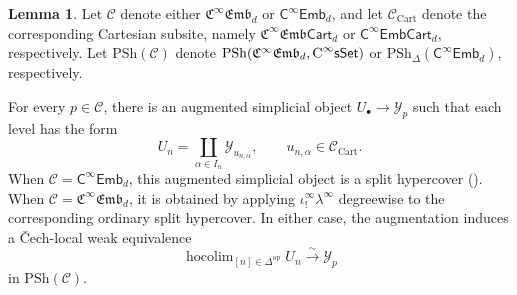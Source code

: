\documentclass{amsart}
\newcommand{\cat}[1]{\mathsf{#1}}
\newcommand{\sset}{\cat{sSet}}
\DeclareMathOperator*{\hocolim}{hocolim}
\newcommand{\CsSet}{\textnormal{C}^{\infty}\sset}
\newcommand{\fembnoniso}[1]{\cat{C}^{\infty}\cat{Emb}_{#1}}
\newcommand{\fembcartnoniso}[1]{\cat{C}^{\infty}\cat{EmbCart}_{#1}}
\newcommand{\femb}[1]{\mathfrak{C}^{\infty}\mathfrak{Emb}_{#1}}
\newcommand{\fembcart}[1]{\mathfrak{C}^{\infty}\mathfrak{Emb}\cat{Cart}_{#1}}
\newcommand{\psh}{\mathrm{PSh}}
\newcommand{\spsh}{\mathrm{PSh}_{\Delta}}
\renewcommand{\op}{\mathrm{op}}
\newcommand{\Yo}{\mathscr{Y}}
\theoremstyle{definition}
\newtheorem{lemma}[equation]{Lemma}
\numberwithin{equation}{subsection}
\numberwithin{subsubsection}{subsection}
\begin{document}
\begin{lemma}\label{lem:hypercover.replacement.Cartesian}
  Let \(\mathcal{C}\) denote either \(\femb{d}\) or
  \(\fembnoniso{d}\), and let \(\mathcal{C}_{\mathrm{Cart}}\) denote the
  corresponding Cartesian subsite, namely \(\fembcart{d}\) or
  \(\fembcartnoniso{d}\), respectively. Let \(\psh(\mathcal{C})\) denote
  \(\psh(\femb{d},\CsSet)\) or \(\spsh(\fembnoniso{d})\), respectively.

  For every \(p\in\mathcal{C}\), there is an augmented simplicial object
  \(U_{\bullet}\to\Yo_{p}\) such that each level has the form
  \[
    U_{n}
    =
    \coprod_{\alpha\in I_{n}}\Yo_{u_{n,\alpha}},
    \qquad
    u_{n,\alpha}\in\mathcal{C}_{\mathrm{Cart}}.
  \]
  When \(\mathcal{C}=\fembnoniso{d}\), this augmented simplicial object is
  a split hypercover (). When
  \(\mathcal{C}=\femb{d}\), it is obtained by applying
  \(\iota_{!}^{\infty}\lambda^{\infty}\) degreewise to the corresponding
  ordinary split hypercover. In either case, the augmentation induces a
  \v{C}ech-local weak equivalence
  \[
    \hocolim_{[n]\in\Delta^{\op}}U_{n}
    \xrightarrow{\sim}
    \Yo_{p}
  \]
  in \(\psh(\mathcal{C})\).
\end{lemma}
\end{document}
